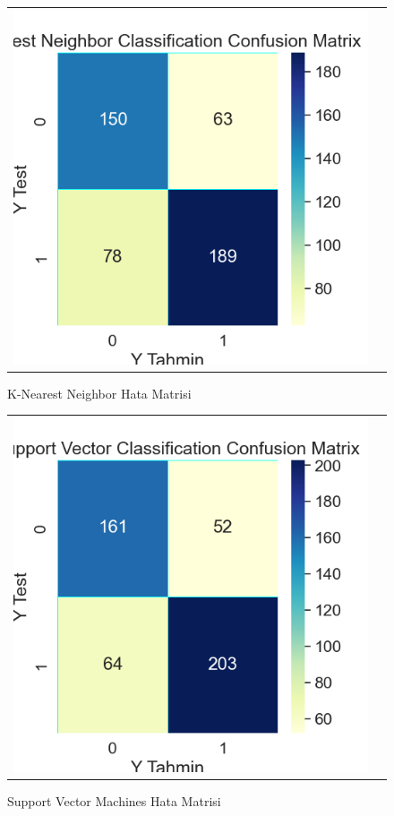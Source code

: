 \documentclass[conference]{IEEEtran}
\begin{document}
\begin{figure}[!h]
	\centering
	\begin{center}
		\begin{tabular}{cc}
			\includegraphics[scale=0.45]{pictures/pic_10.png}&
		\end{tabular}
	\end{center}
	\caption{K-Nearest Neighbor Hata Matrisi}
	\label{fig:10}
\end{figure}
\pagebreak
\begin{figure}[!h]
	\centering
	\begin{center}
		\begin{tabular}{cc}
			\includegraphics[scale=0.45]{pictures/pic_11.png}&
		\end{tabular}
	\end{center}
	\caption{Support Vector Machines Hata Matrisi}
	\label{fig:11}
\end{figure}
\end{document}

